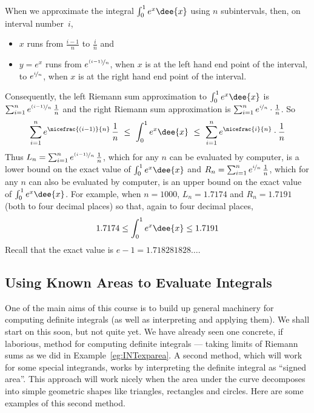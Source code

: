 \begin{eg}
When we approximate the integral $\int_0^1 e^x\dee{x}$ using $n$ subintervals,
then, on interval number~$i$,
\begin{itemize}\itemsep1pt \parskip0pt  %
\item $x$ runs from $\frac{i-1}{n}$ to $\frac{i}{n}$ and
\item $y=e^x$ runs from $e^{\nicefrac{(i-1)}{n}}$, when $x$ is
at the left hand end point of the interval, to $e^{\nicefrac{i}{n}}$,
when $x$ is at the right hand end point of the interval.
\end{itemize}
Consequently, the left Riemann sum approximation to $\int_0^1 e^x\dee{x}$
is $\sum_{i=1}^n e^{\nicefrac{(i-1)}{n}}\,\frac{1}{n}$ and the
right Riemann sum approximation is
$\sum_{i=1}^n e^{\nicefrac{i}{n}}\cdot\frac{1}{n}$. So
\begin{align*}
\sum_{i=1}^n e^{\nicefrac{(i-1)}{n}}\,\frac{1}{n}
\ \le\ \int_0^1 e^x\dee{x}\ \le\
\sum_{i=1}^n e^{\nicefrac{i}{n}}\cdot\frac{1}{n}
\end{align*}
Thus
$L_n=\sum_{i=1}^n e^{\nicefrac{(i-1)}{n}}\,\frac{1}{n}$, which for any $n$
can be evaluated by computer, is a lower bound on the exact value of
$\int_0^1 e^x\dee{x}$ and
$R_n=\sum_{i=1}^n e^{\nicefrac{i}{n}}\,\frac{1}{n}$, which for any $n$
can also be evaluated by computer, is an upper bound on the exact value
of  $\int_0^1 e^x\dee{x}$. For example, when $n=1000$, $L_n= 1.7174$ and
$R_n=1.7191$ (both to four decimal places) so that, again to four
decimal places,
\begin{align*}
1.7174 \le \int_0^1 e^x\dee{x} \le 1.7191
\end{align*}
Recall that the exact value is $e-1 = 1.718281828\dots$.
\end{eg}

\subsection{Using Known Areas to Evaluate Integrals}\label{ssec knownareas}
One of the main aims of this course is to build up general machinery for
computing
definite integrals (as well as interpreting and applying them). We shall start
on this
soon, but not quite yet. We have already seen one concrete, if laborious, method
for
computing definite integrals --- taking limits of Riemann sums as we did in
Example~\ref{eg:INTexparea}. A second method, which will work for some special
integrands, works by interpreting the definite integral as ``signed area''.
This
approach will work nicely when the area under the curve decomposes into simple
geometric
shapes like triangles, rectangles and circles. Here are some examples of this
second method.

